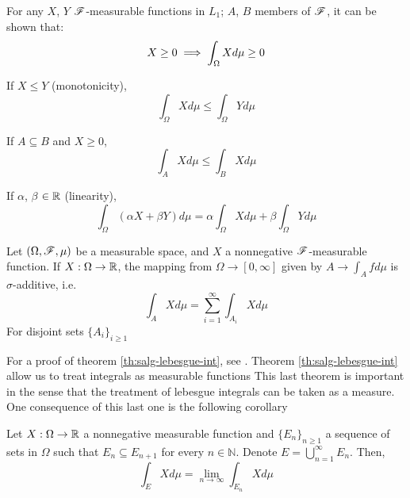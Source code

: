 \documentclass[../TGMAFFIRO.tex]{subfiles}
\begin{document}
\begin{proposition} \label{prop:lebesgue_integral_props}
	For any $X$, $Y$ $\mathscr{F}$-measurable functions in $L_1$; $A$, $B$ members of $\mathscr{F}$, it can be shown that:
	\begin{equation}
		X \geq 0 \implies \int_\Omega X d\mu \geq 0 \\
	\end{equation}
	
	If $X \leq Y$ (monotonicity),
	\begin{equation}
		\int_\Omega X d\mu \leq \int_\Omega Y d\mu
	\end{equation}
	
	If $A \subseteq B$ and $X \geq 0$,
	\begin{equation}
		\int_A X d\mu \leq \int_B X d\mu
	\end{equation}
	
	If $\alpha$, $\beta$ $\in \mathbb{R}$ (linearity),
	\begin{equation}
	\int_\Omega (\alpha X + \beta Y) d\mu = \alpha \int_\Omega X d\mu + \beta \int_\Omega Y d\mu
	\end{equation}
\end{proposition}


\begin{theorem} \label{th:salg-lebesgue-int}
	Let $(\Omega, \mathscr{F}, \mu)$ be a measurable space, and $X$ a nonnegative $\mathscr{F}$-measurable function. If $X: \Omega \to \mathbb{R}$, the mapping from $\Omega \to [0, \infty]$ given by $A \to \int_A f d\mu$ is $\sigma$-additive, i.e.
	\begin{equation}
		\int_A X d\mu = \sum_{i=1}^{\infty}\int_{A_i} X d\mu
	\end{equation}
	For disjoint sets $\{A_i\}_{i\geq1}$
\end{theorem}

For a proof of theorem \ref{th:salg-lebesgue-int}, see . Theorem \ref{th:salg-lebesgue-int} allow us to treat integrals as measurable functions This last theorem is important in the sense that the treatment of lebesgue integrals can be taken as a measure. One consequence of this last one is the following corollary
\begin{corollary} \label{cor:partition_limit_integral}
	Let $X: \Omega \to \mathbb{R}$ a nonnegative measurable function and $\{E_n\}_{n\geq 1}$ a sequence of sets in $\Omega$ such that $E_n \subseteq E_{n+1}$ for every $n \in \mathbb{N}$. Denote $E = \bigcup_{n=1}^{\infty} E_n$. Then,
	\begin{equation}
		\int_E X d\mu = \lim_{n\to \infty} \int_{E_n} X d\mu
	\end{equation}
\end{corollary}
\end{document}
